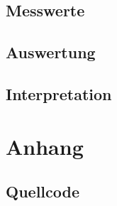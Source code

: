 \documentclass[12pt,oneside,a4paper]{report}
\begin{document}
\section{Messwerte}
\label{chap:VERSUCH_4_MESSWERTE}

\section{Auswertung}
\label{chap:VERSUCH_4_AUSWERTUNG}

\section{Interpretation}
\label{chap:VERSUCH_4_INTERPRETATION}
%
%
\renewcommand\thesection{A.\arabic{section}}
\renewcommand\thesubsection{\thesection.\arabic{subsection}}

\chapter*{Anhang}
\label{chap:APPENDIX}
\addtocounter{chapter}{1}
\setcounter{section}{0}

\section{Quellcode}
\label{chap:APPENDIX_SOURCECODE}
\end{document}
